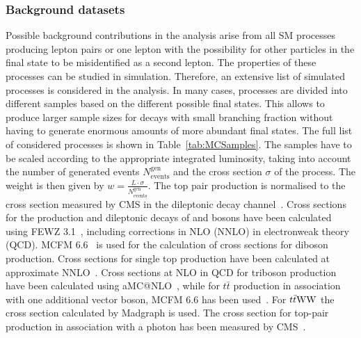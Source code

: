 \subsubsection{Background datasets}
Possible background contributions in the analysis arise from all SM processes producing lepton pairs or one lepton with the possibility for other particles in the final state to be misidentified as a second lepton. The properties of these processes can be studied in simulation. Therefore, an extensive list of simulated processes is considered in the analysis. In many cases, processes are divided into different samples based on the different possible final states. This allows to produce larger sample sizes for decays with small branching fraction without having to generate enormous amounts of more abundant final states. The full list of considered processes is shown in Table~\ref{tab:MCSamples}. The samples have to be scaled according to the appropriate integrated luminosity, taking into account the number of generated events $N_{\text{events}}^{\text{gen}}$ and the cross section $\sigma$ of the process. The weight is then given by $w  = \frac{L\cdot \sigma}{N_{\text{events}}^{\text{gen}}}$. The top pair production is normalised to the cross section measured by CMS in the dileptonic decay channel~\cite{CMS-PAS-TOP-12-007}. Cross sections for the production and dileptonic decays of \W and \Z bosons have been calculated using FEWZ 3.1~\cite{Li:2012wna}, including corrections in NLO (NNLO) in electronweak theory (QCD). MCFM 6.6~\cite{Campbell:2011bn} is used for the calculation of cross sections for diboson production. Cross sections for single top production have been calculated at approximate NNLO~\cite{Kidonakis:2012db}. Cross sections at NLO in QCD for triboson production have been calculated using aMC@NLO~\cite{Madgraph2}, while for $t\bar{t}$ production in association with one additional vector boson, MCFM 6.6 has been used~\cite{Garzelli:2012bn}. For  $t\bar{t}\mathrm{W}\mathrm{W}$ the cross section calculated by Madgraph is used. The cross section for top-pair production in association with a photon has been measured by CMS~\cite{CMS-PAS-TOP-13-011}.  
